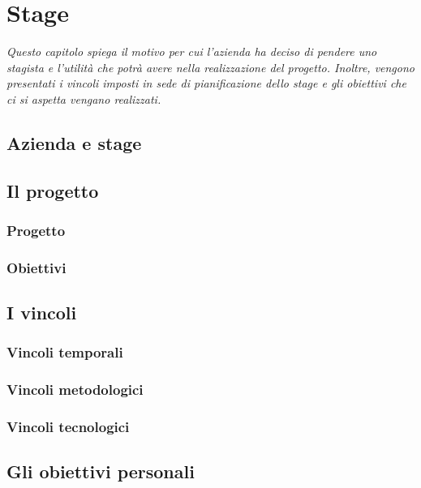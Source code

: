 \chapter{Stage}
\textit{Questo capitolo spiega il motivo per cui l'azienda ha deciso di pendere uno stagista e l'utilità che potrà avere nella realizzazione del progetto. Inoltre, vengono presentati i vincoli imposti in sede di pianificazione dello stage e gli obiettivi che ci si aspetta vengano realizzati.}

\section{Azienda e stage}
\section{Il progetto}
\subsection{Progetto}
\subsection{Obiettivi}
\section{I vincoli}
\subsection{Vincoli temporali}
\subsection{Vincoli metodologici}
\subsection{Vincoli tecnologici}
\section{Gli obiettivi personali}